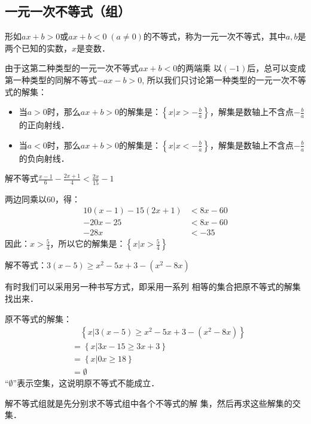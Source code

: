 \subsection{一元一次不等式（组）}
形如$ax+b>0$或$ax+b<0\; (a\ne 0)$的不等式，称为一元一次不等式，其中$a,b$是两个已知的实数，$x$是变数．

由于这第二种类型的一元一次不等式$ax+b<0$的两端乘
以$(-1)$后，总可以变成第一种类型的同解不等式$-ax-b>
0$, 所以我们只讨论第一种类型的一元一次不等式的解集：

\begin{itemize}
    \item 当$a>0$时，那么$ax+b>0$的解集是：$\left\{x\Big|x>-\frac{b}{a}\right\}$，解集是数轴上不含点$-\frac{b}{a}$
的正向射线．
\item 当$a<0$时，那么$ax+b>0$的解集是：$\left\{x\Big|x<-\frac{b}{a}\right\}$，解集是数轴上不含点$-\frac{b}{a}$
的负向射线．
\end{itemize}

\begin{example}
    解不等式$\frac{x-1}{6}-\frac{2x+1}{4}<\frac{2x}{15}-1$
\end{example}

\begin{solution}
两边同乘以60，得：
\[\begin{split}
    10(x-1)-15(2x+1)&<8x-60\\
    -20x-25&<8x-60\\
    -28x&<-35
\end{split}
\]
因此：$x>\frac{5}{4}$，所以它的解集是：$\left\{x\Big|x>\frac{5}{4}\right\}$
\end{solution}

\begin{example}
    解不等式：$3(x-5)\ge x^2-5x+3-(x^2-8x)$
\end{example}

\begin{solution}
    有时我们可以采用另一种书写方式，即采用一系列
相等的集合把原不等式的解集找出来．

原不等式的解集：
\[\begin{split}
&\quad    \left\{x|3(x-5)\ge x^2-5x+3-(x^2-8x)\right\}\\
&=\left\{x|3x-15\ge 3x+3\right\}\\
&=\left\{x|0x\ge 18\right\}\\
&=\emptyset
\end{split}\]
“$\emptyset$”表示空集，这说明原不等式不能成立．

解不等式组就是先分别求不等式组中各个不等式的解
集，然后再求这些解集的交集．
\end{solution}

